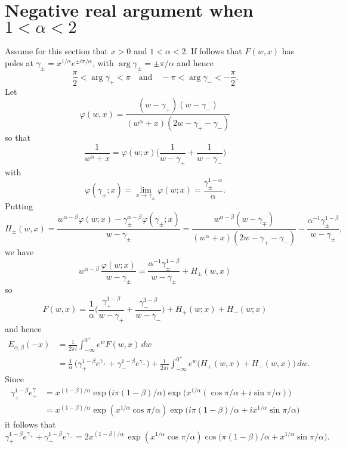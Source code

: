 \documentclass[12pt,a4paper]{article}
\begin{document}
\section{Negative real argument when $1<\alpha<2$}
Assume for this section that $x>0$ and $1<\alpha<2$.  If follows that $F(w,x)$
has poles at $\gamma_\pm=x^{1/\alpha}e^{\pm i\pi/\alpha}$, 
with $\arg\gamma_\pm=\pm\pi/\alpha$ and hence
\[
\frac{\pi}{2}<\arg\gamma_+<\pi
\quad\text{and}\quad
-\pi<\arg\gamma_-<-\frac{\pi}{2}.
\]
Let
\[
\varphi(w,x)=\frac{(w-\gamma_+)(w-\gamma_-)}%
{(w^\alpha+x)(2w-\gamma_+-\gamma_-)}
\]
so that
\[
\frac{1}{w^\alpha+x}=\varphi(w;x)\biggl(
    \frac{1}{w-\gamma_+}+\frac{1}{w-\gamma_-}\biggr)
\]
with
\[
\varphi(\gamma_\pm;x)=\lim_{x\to\gamma_\pm}\varphi(w;x)
    =\frac{\gamma_\pm^{1-\alpha}}{\alpha}.
\]
Putting
\[
H_\pm(w,x)=\frac{w^{\alpha-\beta}\varphi(w;x)
-\gamma_\pm^{\alpha-\beta}\varphi(\gamma_\pm;x)}{w-\gamma_\pm}
    =\frac{w^{\alpha-\beta}(w-\gamma_\mp)}{(w^\alpha+x)(2w-\gamma_+-\gamma_-)}
-\frac{\alpha^{-1}\gamma_\pm^{1-\beta}}{w-\gamma_\pm},
\]
we have
\[
w^{\alpha-\beta}\,\frac{\varphi(w;x)}{w-\gamma_\pm}
    =\frac{\alpha^{-1}\gamma_\pm^{1-\beta}}{w-\gamma_\pm}+H_\pm(w,x)
\]
so
\[
F(w,x)=\frac{1}{\alpha}\biggl(
     \frac{\gamma_+^{1-\beta}}{w-\gamma_+}
    +\frac{\gamma_-^{1-\beta}}{w-\gamma_-}\biggr)
    +H_+(w;x)+H_-(w;x)
\]
and hence
\begin{align*}
E_{\alpha,\beta}(-x)&=\frac{1}{2\pi i}\int_{-\infty}^{0^+}e^wF(w,x)\,dw\\
&=\frac{1}{\alpha}\,\bigl(\gamma_+^{1-\beta}e^{\gamma_+}
    +\gamma_-^{1-\beta}e^{\gamma_-}\bigr)
     +\frac{1}{2\pi i}\int_{-\infty}^{0^+}e^w\bigl(H_+(w,x)+H_-(w,x)\bigr)\,dw.
\end{align*}
Since
\begin{align*}
\gamma_+^{1-\beta}e^\gamma_+&=x^{(1-\beta)/\alpha}
    \exp\bigl(i\pi(1-\beta)/\alpha\bigr)
    \exp\bigl(x^{1/\alpha}(\cos\pi/\alpha+i\sin\pi/\alpha)\bigr)\\
    &=x^{(1-\beta)/\alpha}\exp(x^{1/\alpha}\cos\pi/\alpha)
    \exp\bigl(i\pi(1-\beta)/\alpha+ix^{1/\alpha}\sin\pi/\alpha\bigr)
\end{align*}
it follows that
\[
\gamma_+^{1-\beta}e^{\gamma_+}
    +\gamma_-^{1-\beta}e^{\gamma_-}
    =2x^{(1-\beta)/\alpha}\,\exp(x^{1/\alpha}\cos\pi/\alpha)
    \cos\bigl(\pi(1-\beta)/\alpha+x^{1/\alpha}\sin\pi/\alpha\bigr).
\]
\end{document}
